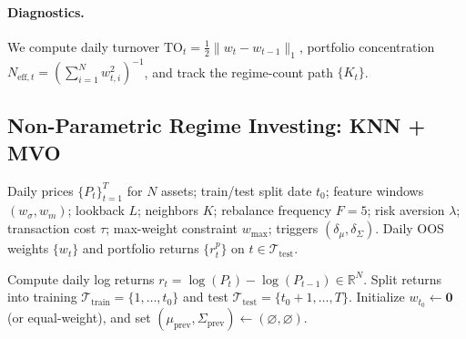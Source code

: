 \documentclass[11pt]{article}
\begin{document}
\paragraph{Diagnostics.}
We compute daily turnover $\mathrm{TO}_t=\frac{1}{2}\|w_t-w_{t-1}\|_1$, portfolio concentration $N_{\mathrm{eff},t}=\left(\sum_{i=1}^{N}w_{t,i}^2\right)^{-1}$, and track the regime-count path $\{K_t\}$.
\subsection{Non-Parametric Regime Investing: KNN + MVO}
\label{subsec:knn_mvo_pseudocode}

\begin{algorithm}[H]
\caption{Non-Parametric Regime Investing}
\label{alg:knn_mvo_weekly_trigger}
\begin{algorithmic}[1]
\Require
Daily prices $\{P_t\}_{t=1}^T$ for $N$ assets; train/test split date $t_0$; feature windows $(w_{\sigma},w_m)$; lookback $L$; neighbors $K$; rebalance frequency $F{=}5$; risk aversion $\lambda$; transaction cost $\tau$; max-weight constraint $w_{\max}$; triggers $(\delta_\mu,\delta_\Sigma)$.
\Ensure
Daily OOS weights $\{w_t\}$ and portfolio returns $\{r^{p}_t\}$ on $t\in\mathcal{T}_{\text{test}}$.

\State Compute daily log returns $r_t=\log(P_t)-\log(P_{t-1}) \in \mathbb{R}^N$.
\State Split returns into training $\mathcal{T}_{\text{train}}=\{1,\dots,t_0\}$ and test $\mathcal{T}_{\text{test}}=\{t_0+1,\dots,T\}$.
\State Initialize $w_{t_0} \leftarrow \mathbf{0}$ (or equal-weight), and set $(\mu_{\text{prev}},\Sigma_{\text{prev}})\leftarrow (\varnothing,\varnothing)$.


\end{algorithmic}
\end{algorithm}
\end{document}
